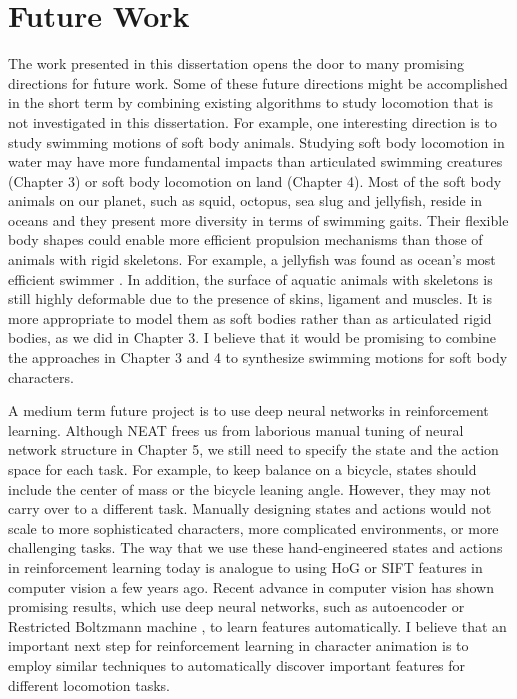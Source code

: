 \section{Future Work}

The work presented in this dissertation opens the door to many promising directions for future work. Some of these future directions might be accomplished in the short term by combining existing algorithms to study locomotion that is not investigated in this dissertation. For example, one interesting direction is to study swimming motions of soft body animals. Studying soft body locomotion in water may have more fundamental impacts than articulated swimming creatures (Chapter 3) or soft body locomotion on land (Chapter 4). Most of the soft body animals on our planet, such as squid, octopus, sea slug and jellyfish, reside in oceans and they present more diversity in terms of swimming gaits. Their flexible body shapes could enable more efficient propulsion mechanisms than those of animals with rigid skeletons. For example, a jellyfish was found as ocean's most efficient swimmer \cite{Gemmell:2013}. In addition, the surface of aquatic animals with skeletons is still highly deformable due to the presence of skins, ligament and muscles. It is more appropriate to model them as soft bodies rather than as articulated rigid bodies, as we did in Chapter 3. I believe that it would be promising to combine the approaches in Chapter 3 and 4 to synthesize swimming motions for soft body characters.

A medium term future project is to use deep neural networks in reinforcement learning. Although NEAT frees us from laborious manual tuning of neural network structure in Chapter 5, we still need to specify the state and the action space for each task. For example, to keep balance on a bicycle, states should include the center of mass or the bicycle leaning angle. However, they may not carry over to a different task. Manually designing states and actions would not scale to more sophisticated characters, more complicated environments, or more challenging tasks. The way that we use these hand-engineered states and actions in reinforcement learning today is analogue to using HoG or SIFT features in computer vision a few years ago. Recent advance in computer vision has shown promising results, which use deep neural networks, such as autoencoder \cite{Vincent:2008} or Restricted Boltzmann machine \cite{Hinton:2012}, to learn features automatically. I believe that an important next step for reinforcement learning in character animation is to employ similar techniques to automatically discover important features for different locomotion tasks.

